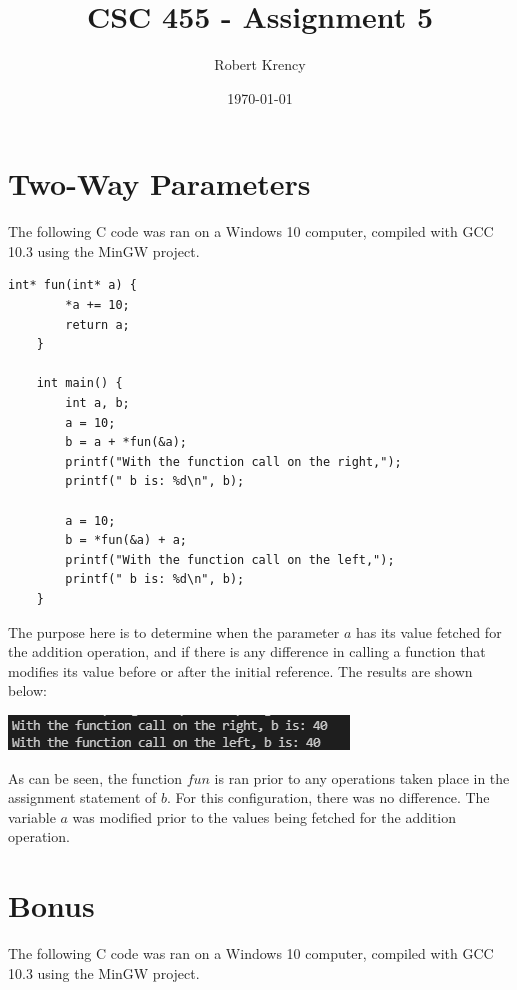\documentclass[12pt]{article}
\title{CSC 455 - Assignment 5}
\author{Robert Krency}
\date{\today}
\begin{document}
\maketitle

\section{Two-Way Parameters}

The following C code was ran on a Windows 10 computer, compiled with GCC 10.3 using the MinGW project.

\begin{lstlisting}[style=CStyle]
    int* fun(int* a) {
        *a += 10;
        return a;
    }

    int main() {
        int a, b;
        a = 10;
        b = a + *fun(&a);
        printf("With the function call on the right,");
        printf(" b is: %d\n", b);

        a = 10;
        b = *fun(&a) + a;
        printf("With the function call on the left,");
        printf(" b is: %d\n", b);
    }
\end{lstlisting}

The purpose here is to determine when the parameter $a$ has its value fetched for the addition operation, and if there
is any difference in calling a function that modifies its value before or after the initial reference. 
The results are shown below:

\vspace{5mm}

\begin{center}
    \includegraphics{a5-params.png}
\end{center}

As can be seen, the function $fun$ is ran prior to any operations taken place in the assignment statement of $b$.
For this configuration, there was no difference.
The variable $a$ was modified prior to the values being fetched for the addition operation.

\pagebreak

\section{Bonus}

The following C code was ran on a Windows 10 computer, compiled with GCC 10.3 using the MinGW project.
\end{document}
